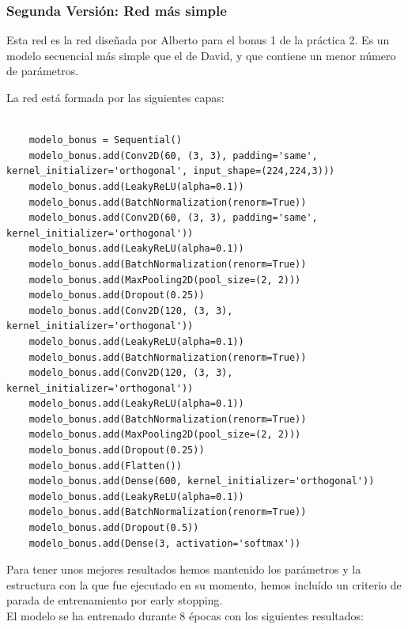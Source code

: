 \documentclass[11pt,a4paper]{article}
\theoremstyle{definition}
\begin{document}
\subsubsection{Segunda Versión: Red más simple}

Esta red es la red diseñada por Alberto para el bonus 1 de la práctica 2. Es un modelo secuencial más simple que el de David, y que contiene un menor número de parámetros.

La red está formada por las siguientes capas:

\begin{lstlisting}

    modelo_bonus = Sequential()
    modelo_bonus.add(Conv2D(60, (3, 3), padding='same', kernel_initializer='orthogonal', input_shape=(224,224,3)))
    modelo_bonus.add(LeakyReLU(alpha=0.1))
    modelo_bonus.add(BatchNormalization(renorm=True))
    modelo_bonus.add(Conv2D(60, (3, 3), padding='same', kernel_initializer='orthogonal'))
    modelo_bonus.add(LeakyReLU(alpha=0.1))
    modelo_bonus.add(BatchNormalization(renorm=True))
    modelo_bonus.add(MaxPooling2D(pool_size=(2, 2)))
    modelo_bonus.add(Dropout(0.25))
    modelo_bonus.add(Conv2D(120, (3, 3), kernel_initializer='orthogonal'))
    modelo_bonus.add(LeakyReLU(alpha=0.1))
    modelo_bonus.add(BatchNormalization(renorm=True))
    modelo_bonus.add(Conv2D(120, (3, 3), kernel_initializer='orthogonal'))
    modelo_bonus.add(LeakyReLU(alpha=0.1))
    modelo_bonus.add(BatchNormalization(renorm=True))
    modelo_bonus.add(MaxPooling2D(pool_size=(2, 2)))
    modelo_bonus.add(Dropout(0.25))
    modelo_bonus.add(Flatten())
    modelo_bonus.add(Dense(600, kernel_initializer='orthogonal'))
    modelo_bonus.add(LeakyReLU(alpha=0.1))
    modelo_bonus.add(BatchNormalization(renorm=True))
    modelo_bonus.add(Dropout(0.5))
    modelo_bonus.add(Dense(3, activation='softmax'))

\end{lstlisting}

Para tener unos mejores resultados hemos mantenido los parámetros y la estructura con la que fue ejecutado en su momento, hemos incluído un criterio de parada de entrenamiento por early stopping.\\

El modelo se ha entrenado durante 8 épocas con los siguientes resultados:
\end{document}
